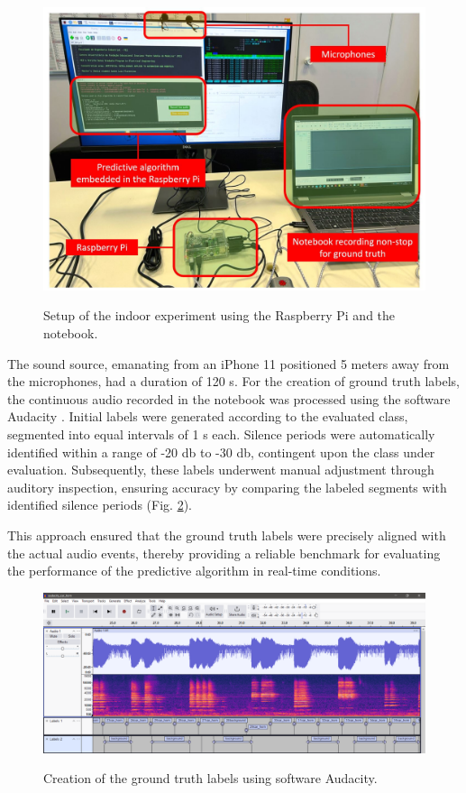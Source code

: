 \begin{figure}[htbp]
    \raggedright
        \caption{Setup of the indoor experiment using the Raspberry Pi and the notebook.}
        \includegraphics[width=.8\textwidth]{resources/images/050-methods/Methods_evaluation_indoor.jpg}
        \label{fig:methods_evaluation_indoor_experiment}
\end{figure}

The sound source, emanating from an iPhone 11 positioned 5 meters away from the microphones, had a duration of 120 \gls{s}. For the creation of ground truth labels, the continuous audio recorded in the notebook was processed using the software Audacity \cite{Audacity2024}. Initial labels were generated according to the evaluated class, segmented into equal intervals of 1 \gls{s} each. Silence periods were automatically identified within a range of -20 \gls{db} to -30 \gls{db}, contingent upon the class under evaluation. Subsequently, these labels underwent manual adjustment through auditory inspection, ensuring accuracy by comparing the labeled segments with identified silence periods (Fig. \ref{fig:methods_evaluation_audacity_ground_truth}).

This approach ensured that the ground truth labels were precisely aligned with the actual audio events, thereby providing a reliable benchmark for evaluating the performance of the predictive algorithm in real-time conditions.

\begin{figure}[htbp]
    \raggedright
        \caption{Creation of the ground truth labels using software Audacity.}
        \includegraphics[width=1\textwidth]{resources/images/050-methods/Methods_evaluation_audacity_ground_truth.png}
        \label{fig:methods_evaluation_audacity_ground_truth}
\end{figure}

